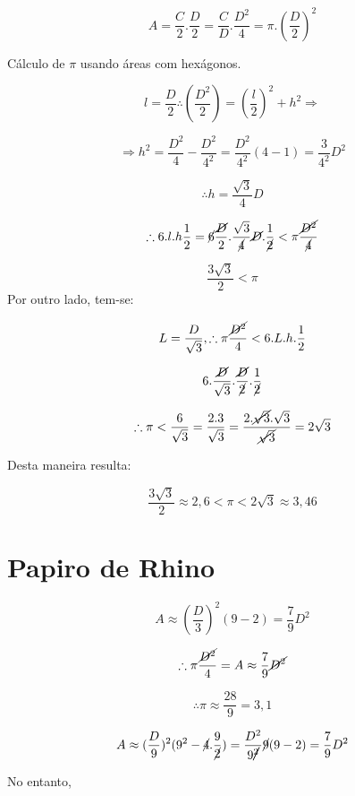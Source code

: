\documentclass[a4paper, 12pt]{article}
\begin{document}
\[A = \frac{C}{2}.\frac{D}{2} = \frac{C}{D}.\frac{D^2}{4} = \pi.(\frac{D}{2})^2\]
\newline

Cálculo de $\pi$ usando áreas com hexágonos.


\[l = \frac{D}{2} \therefore (\frac{D^2}{2}) = (\frac{l}{2})^2 + h^2 \Rightarrow \]

\[\Rightarrow h^2 = \frac{D^2}{4} - \frac{D^2}{4^2} = \frac{D^2}{4^2} (4-1) = \frac{3}{4^2}D^2\]

\[\therefore h= \frac{\sqrt{3}}{4}D\]

\[\therefore 6.l.h\frac{1}{2} = \cancel{6} \frac{\cancel{D}}{2}.\frac{\sqrt{3}}{\cancel{4}}\cancel{D}.\frac{1}{\cancel{2}} <\pi\frac{\cancel{D^2}}{\cancel{4}}\]

\[\frac{3\sqrt{3}}{2} < \pi\]
\newline
Por outro lado, tem-se:

\[L= \frac{D}{\sqrt{3}}, \therefore \pi \frac{\cancel{D^2}}{4} < 6.L.h.\frac{1}{2}\]

\[6.\frac{\cancel{D}}{\sqrt{3}}.\frac{\cancel{D}}{\cancel{2}}.\frac{1}{\cancel{2}}\]

\[\therefore \pi < \frac{6}{\sqrt{3}} = \frac{2.3}{\sqrt{3}} = \frac{2.\cancel{\sqrt{3}}.\sqrt{3}}{\cancel{\sqrt{3}}} = 2\sqrt{3}\]

Desta maneira resulta:

\[\frac{3\sqrt{3}}{2} \approx 2,6 < \pi < 2\sqrt{3} \approx 3,46\]

\newpage

\section{Papiro de Rhino}

\[A \approx (\frac{D}{3})^2 (9-2) = \frac{7}{9}D^2\]

\[\therefore \pi \frac{\cancel{D^2}}{4} = A \approx \frac{7}{9} \cancel{D^2}\]

\[\therefore \pi \approx \frac{28}{9} = 3,1\]

\[A \approx (\frac{D}{9})^2(9^2 - \cancel{4}.\frac{9}{\cancel{2}}) = \frac{D^2}{9\cancel{^2}}\cancel{9}(9-2) = \frac{7}{9}D^2\]

No entanto, 
\end{document}

